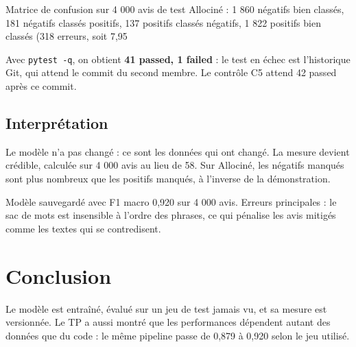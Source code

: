 \documentclass[11pt,a4paper]{article}
\begin{document}
Matrice de confusion sur 4 000 avis de test Allociné : 1 860 négatifs bien classés, 181 négatifs classés positifs, 137 positifs classés négatifs, 1 822 positifs bien classés (318 erreurs, soit 7,95 %

Avec \texttt{pytest -q}, on obtient \textbf{41 passed, 1 failed} : le test en échec est l'historique Git, qui attend le commit du second membre. Le contrôle C5 attend 42 passed après ce commit.

\subsection{Interprétation}

Le modèle n'a pas changé : ce sont les données qui ont changé. La mesure devient crédible, calculée sur 4 000 avis au lieu de 58. Sur Allociné, les négatifs manqués sont plus nombreux que les positifs manqués, à l'inverse de la démonstration.

\begin{reponse}
Modèle sauvegardé avec F1 macro 0,920 sur 4 000 avis. Erreurs principales : le sac de mots est insensible à l'ordre des phrases, ce qui pénalise les avis mitigés comme les textes qui se contredisent.
\end{reponse}

\section*{Conclusion}

Le modèle est entraîné, évalué sur un jeu de test jamais vu, et sa mesure est versionnée. Le TP a aussi montré que les performances dépendent autant des données que du code : le même pipeline passe de 0,879 à 0,920 selon le jeu utilisé.
\end{document}
